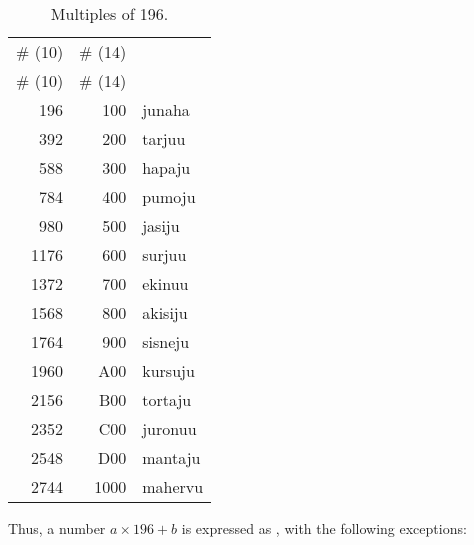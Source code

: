 \documentclass{book}
\begin{document}
\begin{longtabu}[c]{|r|r|X|}
    \caption{Multiples of 196.}
    \centering
    
    \\ \hline
    \# (10) & \# (14) & \\
    \hline
    \endfirsthead
    
    \hline
    \# (10) & \# (14) & \\
    \hline
    \endhead
    
    \hline
    \endfoot
    
    \hline
    \endlastfoot
    
    196 & 100 & junaha \\
    392 & 200 & tarjuu \\
    588 & 300 & hapaju \\
    784 & 400 & pumoju \\
    980 & 500 & jasiju \\
    1176 & 600 & surjuu \\
    1372 & 700 & ekinuu \\
    1568 & 800 & akisiju \\
    1764 & 900 & sisneju \\
    1960 & A00 & kursuju \\
    2156 & B00 & tortaju \\
    2352 & C00 & juronuu \\
    2548 & D00 & mantaju \\
    2744 & 1000 & mahervu \\
\end{longtabu}

Thus, a number $a \times 196 + b$ is expressed as , with the following exceptions:
\end{document}

